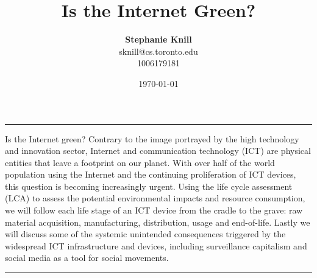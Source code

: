 \documentclass{article}
\begin{document}
\title{Is the Internet Green?}
\author[1]{\textbf{Stephanie Knill} \\ sknill@cs.toronto.edu \\ 1006179181}
\date{\today}

\renewenvironment{abstract}
 {\quotation\small\noindent\rule{\linewidth}{.5pt}\par\smallskip
  {\centering\bfseries\abstractname\par}\medskip}
 {\par\noindent\rule{\linewidth}{.5pt}\endquotation}

\maketitle
\begin{abstract}
\noindent Is the Internet green? Contrary to the image portrayed by the high technology and innovation sector, Internet and communication technology (ICT) are physical entities that leave a footprint on our planet. With over half of the world population using the Internet and the continuing proliferation of ICT devices, this question is becoming increasingly urgent. Using the life cycle assessment (LCA) to assess the potential environmental impacts and resource consumption, we will follow each life stage of an ICT device from the cradle to the grave: raw material acquisition, manufacturing, distribution, usage and end-of-life. 
Lastly we will discuss some of the systemic unintended consequences triggered by the widespread ICT infrastructure and devices, including surveillance capitalism and social media as a tool for social movements.

\end{abstract}

\end{document}
